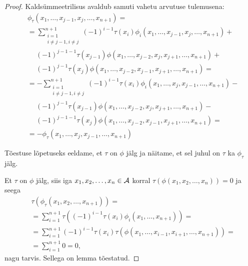 \begin{proof}
    Kaldsümmeetrilisus avaldub samuti vahetu arvutuse tulemusena:
    \begin{align*}
        &\phi_\tau(
          x_1, \dots, x_{j-1}, x_j, \dots, x_{n+1}
        ) = \\
        &= \sum_{\substack{i=1\\i \ne j-1, i \ne j}}^{n+1}
          (-1)^{i-1} \tau(x_i) \phi_i(
              x_1, \dots, x_{j-1}, x_j, \dots, x_{n+1}
          ) + \\
        &\quad\ (-1)^{j-1-1} \tau(x_{j-1}) \phi(
              x_1, \dots, x_{j-2}, x_j, x_{j+1}, \dots, x_{n+1}
          ) + \\
        &\quad\ (-1)^{j-1} \tau(x_j) \phi(
              x_1, \dots, x_{j-2}, x_{j-1}, x_{j+1}, \dots, x_{n+1}
          ) = \\
        &= -\sum_{\substack{i=1\\i \ne j-1, i \ne j}}^{n+1}
          (-1)^{i-1} \tau(x_i) \phi_i(
              x_1, \dots, x_j, x_{j-1}, \dots, x_{n+1}
          ) - \\
        &\quad\ (-1)^{j-1} \tau(x_{j-1}) \phi(
              x_1, \dots, x_{j-2}, x_j, x_{j+1}, \dots, x_{n+1}
          ) - \\
        &\quad\ (-1)^{j-1-1} \tau(x_j) \phi(
              x_1, \dots, x_{j-2}, x_{j-1}, x_{j+1}, \dots, x_{n+1}
          ) = \\
        &= - \phi_\tau(
              x_1, \dots, x_j, x_{j-1}, \dots, x_{n+1}
            )
    \end{align*}

    Tõestuse lõpetuseks eeldame, et $\tau$ on $\phi$ jälg ja
    näitame, et sel juhul on $\tau$ ka $\phi_\tau$ jälg.

    Et $\tau$ on $\phi$ jälg, siis iga $x_1, x_2, \dots, x_n \in \mathcal{A}$
    korral $\tau(\phi(x_1, x_2, \dots, x_n)) = 0$ ja seega
    \begin{align*}
        &\tau(\phi_\tau(x_1, x_2, \dots, x_{n+1})) = \\
        &= \sum_{i=1}^{n+1} \tau \left(
            (-1)^{i-1} \tau(x_i) \phi_i(x_1, \dots, x_{n+1})
        \right) = \\
        &= \sum_{i=1}^{n+1} (-1)^{i-1} \tau(x_i) \tau \left(
            \phi(x_1, \dots, x_{i-1}, x_{i+1}, \dots, x_{n+1})
        \right) = \\
        &= \sum_{i=1}^{n+1} 0 = 0,
    \end{align*}
    nagu tarvis. Sellega on lemma tõestatud.
\end{proof}

